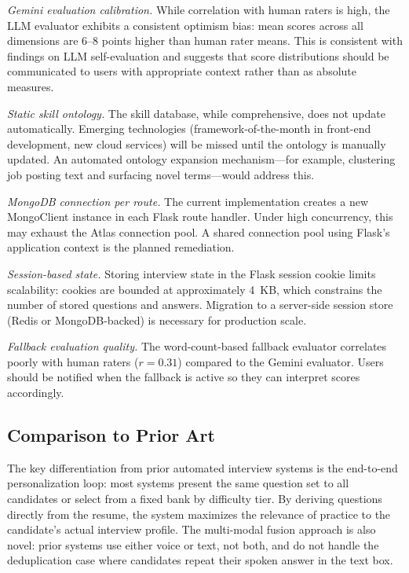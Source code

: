 \documentclass[conference]{IEEEtran}
\begin{document}
\textit{Gemini evaluation calibration.} While correlation with human raters is high, the LLM evaluator exhibits a consistent optimism bias: mean scores across all dimensions are 6--8 points higher than human rater means. This is consistent with findings on LLM self-evaluation \cite{openai2023gpt4} and suggests that score distributions should be communicated to users with appropriate context rather than as absolute measures.

\textit{Static skill ontology.} The skill database, while comprehensive, does not update automatically. Emerging technologies (framework-of-the-month in front-end development, new cloud services) will be missed until the ontology is manually updated. An automated ontology expansion mechanism—for example, clustering job posting text and surfacing novel terms—would address this.

\textit{MongoDB connection per route.} The current implementation creates a new MongoClient instance in each Flask route handler. Under high concurrency, this may exhaust the Atlas connection pool. A shared connection pool using Flask's application context is the planned remediation.

\textit{Session-based state.} Storing interview state in the Flask session cookie limits scalability: cookies are bounded at approximately 4~KB, which constrains the number of stored questions and answers. Migration to a server-side session store (Redis or MongoDB-backed) is necessary for production scale.

\textit{Fallback evaluation quality.} The word-count-based fallback evaluator correlates poorly with human raters ($r = 0.31$) compared to the Gemini evaluator. Users should be notified when the fallback is active so they can interpret scores accordingly.

\subsection{Comparison to Prior Art}

The key differentiation from prior automated interview systems is the end-to-end personalization loop: most systems present the same question set to all candidates or select from a fixed bank by difficulty tier. By deriving questions directly from the resume, the system maximizes the relevance of practice to the candidate's actual interview profile. The multi-modal fusion approach is also novel: prior systems use either voice or text, not both, and do not handle the deduplication case where candidates repeat their spoken answer in the text box.
\end{document}
